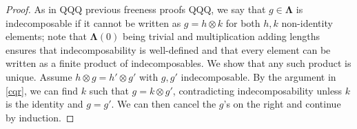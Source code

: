 \documentclass{amsbook} %
\newcommand{\ML}{\mathbf{\Lambda}}
\numberwithin{section}{chapter}
\begin{document}
\begin{proof}
As in QQQ previous freeness proofs QQQ, we say that $g \in \ML$ is indecomposable if it cannot be written as $g = h \otimes k$ for both $h, k$ non-identity elements; note that $\ML(0)$ being trivial and multiplication adding lengths ensures that indecomposability is well-defined and that every element can be written as a finite product of indecomposables. We show that any such product is unique. Assume $h \otimes g = h' \otimes g'$ with $g, g'$ indecomposable. By the argument in \cref{cqr}, we can find $k$ such that $g = k \otimes g'$, contradicting indecomposability unless $k$ is the identity and $g=g'$. We can then cancel the $g$'s on the right and continue by induction.
%

\end{proof}
\end{document}
